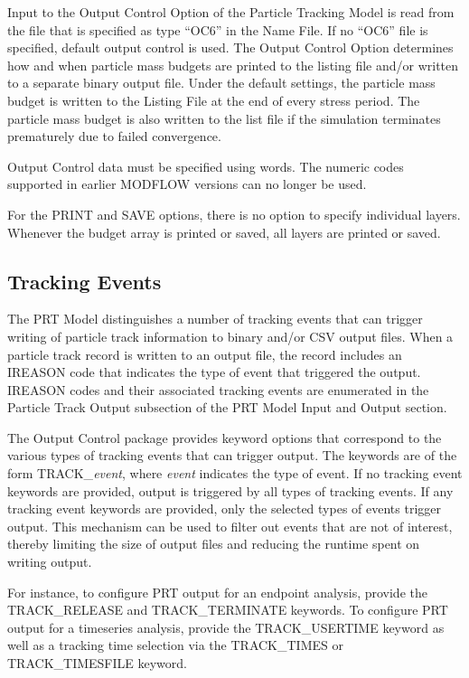 Input to the Output Control Option of the Particle Tracking Model is read from the file that is specified as type ``OC6'' in the Name File. If no ``OC6'' file is specified, default output control is used. The Output Control Option determines how and when particle mass budgets are printed to the listing file and/or written to a separate binary output file.  Under the default settings, the particle mass budget is written to the Listing File at the end of every stress period.  The particle mass budget is also written to the list file if the simulation terminates prematurely due to failed convergence.

Output Control data must be specified using words.  The numeric codes supported in earlier MODFLOW versions can no longer be used.

For the PRINT and SAVE options, there is no option to specify individual layers.  Whenever the budget array is printed or saved, all layers are printed or saved.

\subsection{Tracking Events}

The PRT Model distinguishes a number of tracking events that can trigger writing of particle track information to binary and/or CSV output files. When a particle track record is written to an output file, the record includes an IREASON code that indicates the type of event that triggered the output. IREASON codes and their associated tracking events are enumerated in the Particle Track Output subsection of the PRT Model Input and Output section.
 
The Output Control package provides keyword options that correspond to the various types of tracking events that can trigger output. The keywords are of the form TRACK\_\textit{event}, where \textit{event} indicates the type of event. If no tracking event keywords are provided, output is triggered by all types of tracking events. If any tracking event keywords are provided, only the selected types of events trigger output. This mechanism can be used to filter out events that are not of interest, thereby limiting the size of output files and reducing the runtime spent on writing output.
 
For instance, to configure PRT output for an endpoint analysis, provide the TRACK\_RELEASE and TRACK\_TERMINATE keywords. To configure PRT output for a timeseries analysis, provide the TRACK\_USERTIME keyword as well as a tracking time selection via the TRACK\_TIMES or TRACK\_TIMESFILE keyword.

